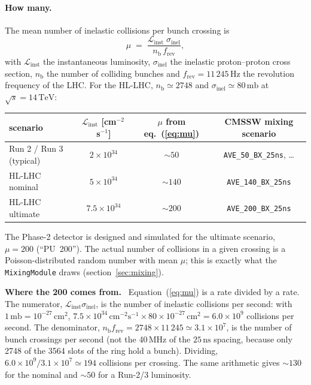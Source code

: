 \documentclass[11pt,a4paper]{article}
\newcommand{\code}[1]{\texttt{#1}}
\newcommand{\ns}{\,\mathrm{ns}}
\newcommand{\mb}{\,\mathrm{mb}}
\newcommand{\sigin}{\ensuremath{\sigma_{\mathrm{inel}}}}
\newenvironment{plainwords}[1][In plain words]{%
  \par\medskip\noindent\setlength{\fboxsep}{6pt}\setlength{\fboxrule}{0.6pt}%
  \begin{lrbox}{\plainbox}\begin{minipage}{\dimexpr\textwidth-2\fboxsep-2\fboxrule\relax}\small
  \textbf{\textcolor{plainrule}{#1.}}\ \ignorespaces}{%
  \end{minipage}\end{lrbox}\noindent\fcolorbox{plainrule}{plainbg}{\usebox{\plainbox}}\par\medskip}
\begin{document}
\paragraph{How many.} The mean number of inelastic collisions per bunch crossing is
\begin{equation}
  \mu \;=\; \frac{\mathcal{L}_{\mathrm{inst}}\;\sigin}{n_{\mathrm{b}}\, f_{\mathrm{rev}}},
  \label{eq:mu}
\end{equation}
with $\mathcal{L}_{\mathrm{inst}}$ the instantaneous luminosity, $\sigin$ the inelastic proton--proton
cross section, $n_{\mathrm{b}}$ the number of colliding bunches and $f_{\mathrm{rev}} = 11\,245\,\mathrm{Hz}$
the revolution frequency of the LHC. For the HL-LHC, $n_{\mathrm{b}} \simeq 2748$ and
$\sigin \simeq 80\mb$ at $\sqrt{s}=14\,\mathrm{TeV}$:
\begin{center}
\begin{tabular}{lccc}
\toprule
scenario & $\mathcal{L}_{\mathrm{inst}}$ [cm$^{-2}$\,s$^{-1}$] & $\mu$ from eq.~(\ref{eq:mu}) & CMSSW mixing scenario \\
\midrule
Run 2 / Run 3 (typical)    & $2\times10^{34}$   & $\sim 50$   & \code{AVE\_50\_BX\_25ns}, \ldots \\
HL-LHC nominal             & $5\times10^{34}$   & $\sim 140$  & \code{AVE\_140\_BX\_25ns} \\
HL-LHC ultimate            & $7.5\times10^{34}$ & $\sim 200$  & \code{AVE\_200\_BX\_25ns} \\
\bottomrule
\end{tabular}
\end{center}
The Phase-2 detector is designed and simulated for the ultimate scenario, $\mu = 200$ (``PU~200'').
The actual number of collisions in a given crossing is a Poisson-distributed random number with mean $\mu$;
this is exactly what the \code{MixingModule} draws (section~\ref{sec:mixing}).

\begin{plainwords}[Where the 200 comes from]
Equation~(\ref{eq:mu}) is a rate divided by a rate. The numerator, $\mathcal{L}_{\mathrm{inst}}\sigin$, is
the number of inelastic collisions per second: with $1\mb = 10^{-27}\,\mathrm{cm}^2$,
$7.5\times10^{34}\,\mathrm{cm^{-2}s^{-1}} \times 80\times10^{-27}\,\mathrm{cm^2} = 6.0\times10^{9}$
collisions per second. The denominator, $n_{\mathrm{b}} f_{\mathrm{rev}} = 2748\times11\,245 \simeq
3.1\times10^{7}$, is the number of bunch crossings per second (not the 40\,MHz of the $25\ns$ spacing,
because only 2748 of the 3564 slots of the ring hold a bunch). Dividing, $6.0\times10^{9} / 3.1\times10^{7}
\simeq 194$ collisions per crossing. The same arithmetic gives $\sim130$ for the nominal and $\sim50$ for a
Run-2/3 luminosity.
\end{plainwords}
\end{document}
